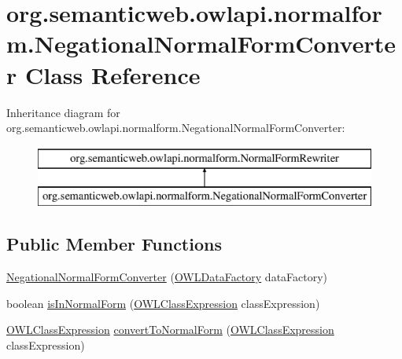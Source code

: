 \hypertarget{classorg_1_1semanticweb_1_1owlapi_1_1normalform_1_1_negational_normal_form_converter}{\section{org.\-semanticweb.\-owlapi.\-normalform.\-Negational\-Normal\-Form\-Converter Class Reference}
\label{classorg_1_1semanticweb_1_1owlapi_1_1normalform_1_1_negational_normal_form_converter}
}
Inheritance diagram for org.\-semanticweb.\-owlapi.\-normalform.\-Negational\-Normal\-Form\-Converter\-:\begin{figure}[H]
\begin{center}
\leavevmode
\includegraphics[height=2.000000cm]{classorg_1_1semanticweb_1_1owlapi_1_1normalform_1_1_negational_normal_form_converter}
\end{center}
\end{figure}
\subsection*{Public Member Functions}
\begin{DoxyCompactItemize}
\item 
\hyperlink{classorg_1_1semanticweb_1_1owlapi_1_1normalform_1_1_negational_normal_form_converter_ad3992a6a205c7a5dc30f27472d1b65fb}{Negational\-Normal\-Form\-Converter} (\hyperlink{interfaceorg_1_1semanticweb_1_1owlapi_1_1model_1_1_o_w_l_data_factory}{O\-W\-L\-Data\-Factory} data\-Factory)
\item 
boolean \hyperlink{classorg_1_1semanticweb_1_1owlapi_1_1normalform_1_1_negational_normal_form_converter_a9fe1ea408355305926d6e72e677cd3e6}{is\-In\-Normal\-Form} (\hyperlink{interfaceorg_1_1semanticweb_1_1owlapi_1_1model_1_1_o_w_l_class_expression}{O\-W\-L\-Class\-Expression} class\-Expression)
\item 
\hyperlink{interfaceorg_1_1semanticweb_1_1owlapi_1_1model_1_1_o_w_l_class_expression}{O\-W\-L\-Class\-Expression} \hyperlink{classorg_1_1semanticweb_1_1owlapi_1_1normalform_1_1_negational_normal_form_converter_a002b8464a0deab69421aacf72a9b478b}{convert\-To\-Normal\-Form} (\hyperlink{interfaceorg_1_1semanticweb_1_1owlapi_1_1model_1_1_o_w_l_class_expression}{O\-W\-L\-Class\-Expression} class\-Expression)
\end{DoxyCompactItemize}
